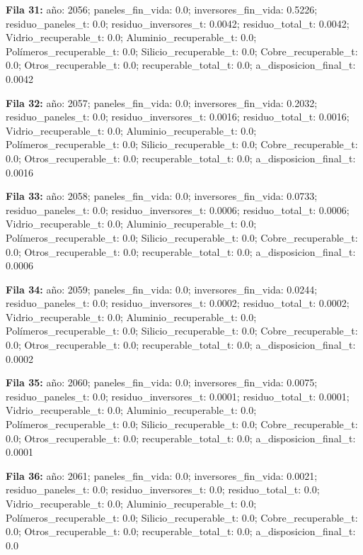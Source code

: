 {\footnotesize\textbf{Fila 31:} año: 2056; paneles\_fin\_vida: 0.0; inversores\_fin\_vida: 0.5226; residuo\_paneles\_t: 0.0; residuo\_inversores\_t: 0.0042; residuo\_total\_t: 0.0042; Vidrio\_recuperable\_t: 0.0; Aluminio\_recuperable\_t: 0.0; Polímeros\_recuperable\_t: 0.0; Silicio\_recuperable\_t: 0.0; Cobre\_recuperable\_t: 0.0; Otros\_recuperable\_t: 0.0; recuperable\_total\_t: 0.0; a\_disposicion\_final\_t: 0.0042\par}
{\footnotesize\textbf{Fila 32:} año: 2057; paneles\_fin\_vida: 0.0; inversores\_fin\_vida: 0.2032; residuo\_paneles\_t: 0.0; residuo\_inversores\_t: 0.0016; residuo\_total\_t: 0.0016; Vidrio\_recuperable\_t: 0.0; Aluminio\_recuperable\_t: 0.0; Polímeros\_recuperable\_t: 0.0; Silicio\_recuperable\_t: 0.0; Cobre\_recuperable\_t: 0.0; Otros\_recuperable\_t: 0.0; recuperable\_total\_t: 0.0; a\_disposicion\_final\_t: 0.0016\par}
{\footnotesize\textbf{Fila 33:} año: 2058; paneles\_fin\_vida: 0.0; inversores\_fin\_vida: 0.0733; residuo\_paneles\_t: 0.0; residuo\_inversores\_t: 0.0006; residuo\_total\_t: 0.0006; Vidrio\_recuperable\_t: 0.0; Aluminio\_recuperable\_t: 0.0; Polímeros\_recuperable\_t: 0.0; Silicio\_recuperable\_t: 0.0; Cobre\_recuperable\_t: 0.0; Otros\_recuperable\_t: 0.0; recuperable\_total\_t: 0.0; a\_disposicion\_final\_t: 0.0006\par}
{\footnotesize\textbf{Fila 34:} año: 2059; paneles\_fin\_vida: 0.0; inversores\_fin\_vida: 0.0244; residuo\_paneles\_t: 0.0; residuo\_inversores\_t: 0.0002; residuo\_total\_t: 0.0002; Vidrio\_recuperable\_t: 0.0; Aluminio\_recuperable\_t: 0.0; Polímeros\_recuperable\_t: 0.0; Silicio\_recuperable\_t: 0.0; Cobre\_recuperable\_t: 0.0; Otros\_recuperable\_t: 0.0; recuperable\_total\_t: 0.0; a\_disposicion\_final\_t: 0.0002\par}
{\footnotesize\textbf{Fila 35:} año: 2060; paneles\_fin\_vida: 0.0; inversores\_fin\_vida: 0.0075; residuo\_paneles\_t: 0.0; residuo\_inversores\_t: 0.0001; residuo\_total\_t: 0.0001; Vidrio\_recuperable\_t: 0.0; Aluminio\_recuperable\_t: 0.0; Polímeros\_recuperable\_t: 0.0; Silicio\_recuperable\_t: 0.0; Cobre\_recuperable\_t: 0.0; Otros\_recuperable\_t: 0.0; recuperable\_total\_t: 0.0; a\_disposicion\_final\_t: 0.0001\par}
{\footnotesize\textbf{Fila 36:} año: 2061; paneles\_fin\_vida: 0.0; inversores\_fin\_vida: 0.0021; residuo\_paneles\_t: 0.0; residuo\_inversores\_t: 0.0; residuo\_total\_t: 0.0; Vidrio\_recuperable\_t: 0.0; Aluminio\_recuperable\_t: 0.0; Polímeros\_recuperable\_t: 0.0; Silicio\_recuperable\_t: 0.0; Cobre\_recuperable\_t: 0.0; Otros\_recuperable\_t: 0.0; recuperable\_total\_t: 0.0; a\_disposicion\_final\_t: 0.0\par}
